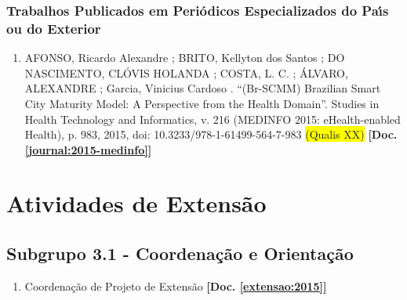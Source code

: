 \documentclass[a4paper,oneside,10pt]{article}
\begin{document}

\subsubsection{Trabalhos Publicados em Peri\'{o}dicos Especializados do Pa\'{\i}s ou do Exterior}
\vspace{0.3cm}

\begin{enumerate}
\renewcommand{\labelenumi}{{\large\bfseries\arabic{enumi}.}}

\item AFONSO, Ricardo Alexandre ; BRITO, Kellyton dos Santos ; DO NASCIMENTO, CLÓVIS HOLANDA ; COSTA, L.  C. ; ÁLVARO, ALEXANDRE ; Garcia, Vinicius Cardoso . ``(Br-SCMM) Brazilian Smart City Maturity Model: A Perspective from the Health Domain''. Studies in Health Technology and Informatics, v. 216 (MEDINFO 2015: eHealth-enabled Health), p. 983, 2015, doi: 10.3233/978-1-61499-564-7-983 \colorbox{yellow}{(Qualis XX)} \textbf{[Doc. \ref{journal:2015-medinfo}]}

\end{enumerate}

\newpage
\section{Atividades de Extens\~{a}o}

\subsection{Subgrupo 3.1 - Coordenação e Orientação}
\vspace{0.3cm}

\begin{enumerate}
\renewcommand{\labelenumi}{{\large\bfseries\arabic{enumi}.}}

    \item Coordenação de Projeto de Extensão \textbf{[Doc. \ref{extensao:2015}]}

\end{enumerate}
\end{document}
